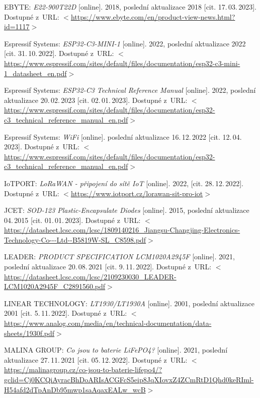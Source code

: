 \begin{thebibliography}{99}
    EBYTE:
    \emph{E22-900T22D}\/ [online].
    2018, poslední aktualizace 2018 [cit. 17.\,03.\,2023].
    Dostupné z~URL:
    \(<\)\url{https://www.ebyte.com/en/product-view-news.html?id=1117}\(>\)

    Espressif Systems:
    \emph{ESP32-C3-MINI-1}\/ [online].
    2022, poslední aktualizace 2022 [cit. 31.\,10.\,2022].
    Dostupné z~URL:
    \(<\)\url{https://www.espressif.com/sites/default/files/documentation/esp32-c3-mini-1_datasheet_en.pdf}\(>\)

    Espressif Systems:
    \emph{ESP32-C3 Technical Reference Manual}\/ [online].
    2022, poslední aktualizace 20.\,02.\,2023 [cit. 02.\,01.\,2023].
    Dostupné z~URL:
    \(<\)\url{https://www.espressif.com/sites/default/files/documentation/esp32-c3_technical_reference_manual_en.pdf}\(>\)

    Espressif Systems:
    \emph{WiFi}\/ [online].
    poslední aktualizace 16.\,12.\,2022 [cit. 12.\,04.\,2023].
    Dostupné z~URL:
    \(<\)\url{https://www.espressif.com/sites/default/files/documentation/esp32-c3_technical_reference_manual_en.pdf}\(>\)


    IoTPORT:
    \emph{LoRaWAN - připojení do sítě IoT}\/ [online].
    2022, [cit. 28.\,12.\,2022].
    Dostupné z~URL:
    \(<\)\url{https://www.iotport.cz/lorawan-sit-pro-iot}\(>\)
 
    JCET:
    \emph{SOD-123 Plastic-Encapsulate Diodes}\/ [online].
    2015, poslední aktualizace 04.\,2015 [cit. 01.\,01.\,2023]. 
    Dostupné z~URL:
    \(<\)\url{https://datasheet.lcsc.com/lcsc/1809140216_Jiangsu-Changjing-Electronics-Technology-Co---Ltd--B5819W-SL_C8598.pdf}\(>\)

    LEADER:
    \emph{PRODUCT SPECIFICATION LCM1020A2945F}\/ [online].
    2021, poslední aktualizace 20.\,08.\,2021 [cit. 9.\,11.\,2022].
    Dostupné z~URL: 
    \(<\)\url{https://datasheet.lcsc.com/lcsc/2109230030_LEADER-LCM1020A2945F_C2891560.pdf}\(>\)

    LINEAR TECHNOLOGY:
    \emph{LT1930/LT1930A}\/ [online].
    2001, poslední aktualizace 2001 [cit. 5.\,11.\,2022].
    Dostupné z~URL: 
    \(<\)\url{https://www.analog.com/media/en/technical-documentation/data-sheets/1930f.pdf}\(>\)

    MALINA GROUP:
    \emph{Co jsou to baterie LiFePO4?}\/ [online].
    2021, poslední aktualizace 27.\,11.\,2021 [cit. 05.\,12.\,2022].
    Dostupné z~URL:
    \(<\)\url{https://malinagroup.cz/co-jsou-to-baterie-lifepo4/?gclid=Cj0KCQiAyracBhDoARIsACGFcS5eip8JqXIovxZ4ZCmRtD1Qhd0keRIml-H54afd2dTpAnDb95mwp1saAqaxEALw_wcB}\(>\)


\end{thebibliography}
